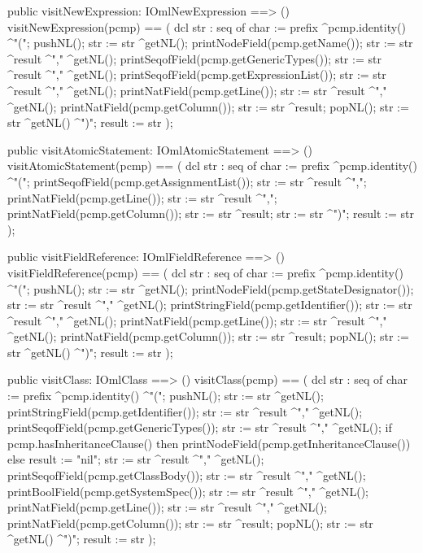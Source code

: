 \begin{vdm_al}
  public visitNewExpression: IOmlNewExpression ==> ()
  visitNewExpression(pcmp) ==
    ( dcl str : seq of char := prefix ^pcmp.identity() ^"(";
      pushNL();
      str := str ^getNL();
      printNodeField(pcmp.getName());
      str := str ^result ^"," ^getNL();
      printSeqofField(pcmp.getGenericTypes());
      str := str ^result ^"," ^getNL();
      printSeqofField(pcmp.getExpressionList());
      str := str ^result ^"," ^getNL();
      printNatField(pcmp.getLine());
      str := str ^result ^"," ^getNL();
      printNatField(pcmp.getColumn());
      str := str ^result;
      popNL();
      str := str ^getNL() ^")";
      result := str );

  public visitAtomicStatement: IOmlAtomicStatement ==> ()
  visitAtomicStatement(pcmp) ==
    ( dcl str : seq of char := prefix ^pcmp.identity() ^"(";
      printSeqofField(pcmp.getAssignmentList());
      str := str ^result ^",";
      printNatField(pcmp.getLine());
      str := str ^result ^",";
      printNatField(pcmp.getColumn());
      str := str ^result;
      str := str ^")";
      result := str );

  public visitFieldReference: IOmlFieldReference ==> ()
  visitFieldReference(pcmp) ==
    ( dcl str : seq of char := prefix ^pcmp.identity() ^"(";
      pushNL();
      str := str ^getNL();
      printNodeField(pcmp.getStateDesignator());
      str := str ^result ^"," ^getNL();
      printStringField(pcmp.getIdentifier());
      str := str ^result ^"," ^getNL();
      printNatField(pcmp.getLine());
      str := str ^result ^"," ^getNL();
      printNatField(pcmp.getColumn());
      str := str ^result;
      popNL();
      str := str ^getNL() ^")";
      result := str );

  public visitClass: IOmlClass ==> ()
  visitClass(pcmp) ==
    ( dcl str : seq of char := prefix ^pcmp.identity() ^"(";
      pushNL();
      str := str ^getNL();
      printStringField(pcmp.getIdentifier());
      str := str ^result ^"," ^getNL();
      printSeqofField(pcmp.getGenericTypes());
      str := str ^result ^"," ^getNL();
      if pcmp.hasInheritanceClause()
      then printNodeField(pcmp.getInheritanceClause())
      else result := "nil";
      str := str ^result ^"," ^getNL();
      printSeqofField(pcmp.getClassBody());
      str := str ^result ^"," ^getNL();
      printBoolField(pcmp.getSystemSpec());
      str := str ^result ^"," ^getNL();
      printNatField(pcmp.getLine());
      str := str ^result ^"," ^getNL();
      printNatField(pcmp.getColumn());
      str := str ^result;
      popNL();
      str := str ^getNL() ^")";
      result := str );


\end{vdm_al}
